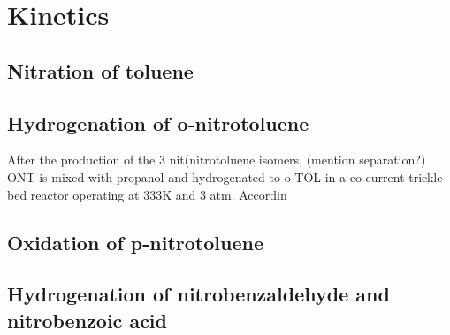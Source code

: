 \section{Kinetics}
\subsection{Nitration of toluene}
\subsection{Hydrogenation of o-nitrotoluene}
After the production of the 3 nit(nitrotoluene isomers, (mention separation?) ONT is mixed with propanol and hydrogenated to o-TOL in a co-current trickle bed reactor operating at 333K and 3 atm. Accordin
\subsection{Oxidation of p-nitrotoluene}
\subsection{Hydrogenation of nitrobenzaldehyde and nitrobenzoic acid}